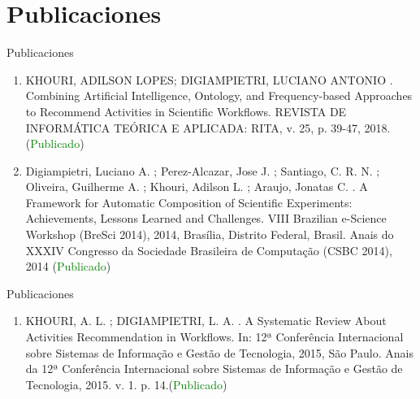 \section{Publicaciones}

\begin{frame}
	\begin{block}{Publicaciones}
		\begin{enumerate}

			\item KHOURI, ADILSON LOPES; DIGIAMPIETRI, LUCIANO ANTONIO . Combining Artificial Intelligence, Ontology, and Frequency-based Approaches to Recommend Activities in Scientific Workflows. REVISTA DE INFORMÁTICA TEÓRICA E APLICADA: RITA, v. 25, p. 39-47, 2018.  (\textcolor{green}{Publicado})	
			
			\item Digiampietri, Luciano A. ; Perez-Alcazar, Jose J. ; Santiago, C. R. N. ; Oliveira, Guilherme A. ; Khouri, Adilson L. ; Araujo, Jonatas C. . A Framework for Automatic Composition of Scientific Experiments: Achievements, Lessons Learned and Challenges. VIII Brazilian e-Science Workshop (BreSci 2014), 2014, Brasília, Distrito Federal, Brasil. Anais do XXXIV Congresso da Sociedade Brasileira de Computação (CSBC 2014), 2014 (\textcolor{green}{Publicado})
			
		\end{enumerate}
		
	\end{block}
\end{frame}

\begin{frame}
	\begin{block}{Publicaciones}
		\begin{enumerate}

			\item  KHOURI, A. L. ; DIGIAMPIETRI, L. A. . A Systematic Review About Activities Recommendation in Workflows. In: 12ª Conferência Internacional sobre Sistemas de Informação e Gestão de Tecnologia, 2015, São Paulo. Anais da 12ª Conferência Internacional sobre Sistemas de Informação e Gestão de Tecnologia, 2015. v. 1. p. 14.(\textcolor{green}{Publicado})
			
		\end{enumerate}
		
	\end{block}
\end{frame}
